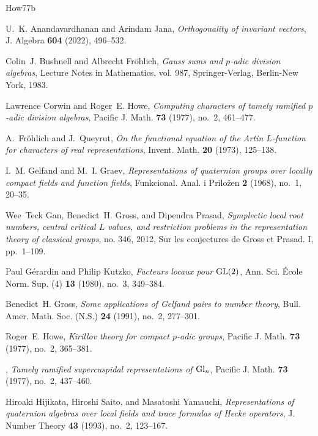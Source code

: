 \documentclass[12pt]{amsart}
\theoremstyle{definition}
\theoremstyle{remark}
\begin{document}
\begin{thebibliography}{How77b}

U.~K. Anandavardhanan and Arindam Jana, \emph{Orthogonality of invariant
  vectors}, J. Algebra \textbf{604} (2022), 496--532. 

Colin~J. Bushnell and Albrecht Fr\"{o}hlich, \emph{Gauss sums and {$p$}-adic
  division algebras}, Lecture Notes in Mathematics, vol. 987, Springer-Verlag,
  Berlin-New York, 1983. 

Lawrence Corwin and Roger~E. Howe, \emph{Computing characters of tamely
  ramified {$p$}-adic division algebras}, Pacific J. Math. \textbf{73} (1977),
  no.~2, 461--477. 

A.~Fr\"{o}hlich and J.~Queyrut, \emph{On the functional equation of the {A}rtin
  {$L$}-function for characters of real representations}, Invent. Math.
  \textbf{20} (1973), 125--138. 

I.~M. Gelfand and M.~I. Graev, \emph{Representations of quaternion groups over
  locally compact fields and function fields}, Funkcional. Anal. i Prilo\v{z}en
  \textbf{2} (1968), no.~1, 20--35. 

Wee~Teck Gan, Benedict~H. Gross, and Dipendra Prasad, \emph{Symplectic local
  root numbers, central critical {$L$} values, and restriction problems in the
  representation theory of classical groups}, no. 346, 2012, Sur les
  conjectures de Gross et Prasad. I, pp.~1--109. 

Paul G\'{e}rardin and Philip Kutzko, \emph{Facteurs locaux pour {${\rm
  GL}(2)$}}, Ann. Sci. \'{E}cole Norm. Sup. (4) \textbf{13} (1980), no.~3,
  349--384. 

Benedict~H. Gross, \emph{Some applications of {G}elfand pairs to number
  theory}, Bull. Amer. Math. Soc. (N.S.) \textbf{24} (1991), no.~2, 277--301.

Roger~E. Howe, \emph{Kirillov theory for compact {$p$}-adic groups}, Pacific J.
  Math. \textbf{73} (1977), no.~2, 365--381. 

\bysame, \emph{Tamely ramified supercuspidal representations of {${\rm
  Gl}_{n}$}}, Pacific J. Math. \textbf{73} (1977), no.~2, 437--460. 

Hiroaki Hijikata, Hiroshi Saito, and Masatoshi Yamauchi, \emph{Representations
  of quaternion algebras over local fields and trace formulas of {H}ecke
  operators}, J. Number Theory \textbf{43} (1993), no.~2, 123--167.


\end{thebibliography}
\end{document}
